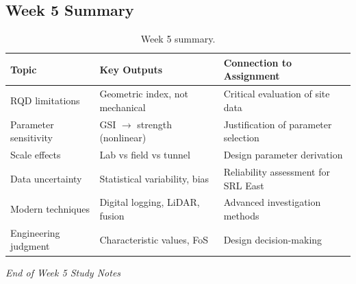 \documentclass[a4paper,12pt]{article}
\begin{document}
\subsection{Week 5 Summary}
\begin{table}[h!]
\centering
\begin{tabularx}{\textwidth}{l X X}
\toprule
\textbf{Topic} & \textbf{Key Outputs} & \textbf{Connection to Assignment} \\
\midrule
RQD limitations & Geometric index, not mechanical & Critical evaluation of site data \\
Parameter sensitivity & GSI $\to$ strength (nonlinear) & Justification of parameter selection \\
Scale effects & Lab vs field vs tunnel & Design parameter derivation \\
Data uncertainty & Statistical variability, bias & Reliability assessment for SRL East \\
Modern techniques & Digital logging, LiDAR, fusion & Advanced investigation methods \\
Engineering judgment & Characteristic values, FoS & Design decision-making \\
\bottomrule
\end{tabularx}
\caption{Week 5 summary.}
\end{table}

\vspace{1cm}
\noindent\textit{End of Week 5 Study Notes}
\end{document}
